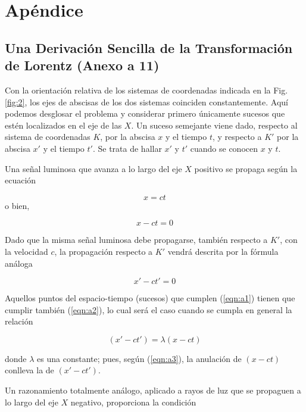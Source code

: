\documentclass[spanish]{book}
\begin{document}
\part{Apéndice}

\appendix

\chapter{Una Derivación Sencilla de la Transformación de Lorentz (Anexo a 11)}

Con la orientación relativa de los sistemas de coordenadas indicada en la Fig.\ref{fig:2}, los
ejes de abscisas de los dos sistemas coinciden constantemente. Aquí podemos desglosar
el problema y considerar primero únicamente sucesos que estén localizados en el eje
de las $X$. Un suceso semejante viene dado, respecto al sistema de coordenadas $K$,
por la abscisa $x$ y el tiempo $t$, y respecto a $K'$ por la abscisa $x'$ y el tiempo $t'$. Se trata
de hallar $x'$ y $t'$ cuando se conocen $x$ y $t$.

Una señal luminosa que avanza a lo largo del eje $X$ positivo se propaga según la
ecuación

\[x=ct\]
o bien,

\begin{equation}
x-ct=0\label{eqn:a1}
\end{equation}

Dado que la misma señal luminosa debe propagarse, también respecto a $K'$, con la
velocidad $c$, la propagación respecto a $K'$ vendrá descrita por la fórmula análoga

\begin{equation}
x'-ct'=0\label{eqn:a2}
\end{equation}

Aquellos puntos del espacio-tiempo (sucesos) que cumplen (\ref{eqn:a1}) tienen que cumplir
también (\ref{eqn:a2}), lo cual será el caso cuando se cumpla en general la relación

\begin{equation}
(x'-ct')=\lambda(x-ct)\label{eqn:a3}
\end{equation}

\noindent donde $\lambda$ es una constante; pues, según (\ref{eqn:a3}), la anulación de $(x-ct)$ 
conlleva la de $(x'-ct')$.

Un razonamiento totalmente análogo, aplicado a rayos de luz que se propaguen a
lo largo del eje $X$ negativo, proporciona la condición
\end{document}
